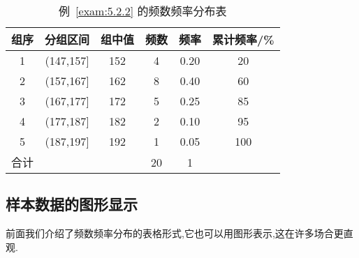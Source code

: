 \begin{table}[!ht]
  \centering
  \caption{例~\ref{exam:5.2.2} 的频数频率分布表}\label{table5.2.1}
\begin{tabularx}{0.7\textwidth}{cccccc}
\toprule
组序&分组区间&组中值&频数&频率&累计频率/\%\\
\midrule
1&(147,157]&152&4&0.20&20\\
2&(157,167]&162&8&0.40&60\\
3&(167,177]&172&5&0.25&85\\
4&(177,187]&182&2&0.10&95\\
5&(187,197]&192&1&0.05&100\\
合计&&&20&1&\\
\bottomrule
\end{tabularx}
\end{table}
\subsection{样本数据的图形显示\label{ssec:5.2.3}}
前面我们介绍了频数频率分布的表格形式,它也可以用图形表示,这在许多场合更直观.
